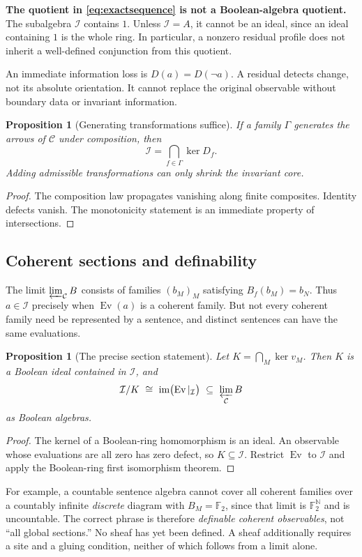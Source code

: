 \documentclass[11pt,letterpaper]{article}
\newtheorem{proposition}[theorem]{Proposition}
\theoremstyle{definition}
\newcommand{\F}{\mathbb F_2}
\newcommand{\im}{\operatorname{im}}
\newcommand{\Ev}{\operatorname{Ev}}
\newcommand{\Inv}{\mathcal I}
\begin{document}
\textbf{The quotient in \eqref{eq:exactsequence} is not a Boolean-algebra quotient.} The subalgebra $\Inv$ contains $1$. Unless $\Inv=A$, it cannot be an ideal, since an ideal containing $1$ is the whole ring. In particular, a nonzero residual profile does not inherit a well-defined conjunction from this quotient.

An immediate information loss is $D(a)=D(\neg a)$. A residual detects change, not its absolute orientation. It cannot replace the original observable without boundary data or invariant information.

\begin{proposition}[Generating transformations suffice]\label{prop:generators}
If a family $\Gamma$ generates the arrows of $\mathcal C$ under composition, then
\[
\Inv=\bigcap_{f\in\Gamma}\ker D_f.
\]
Adding admissible transformations can only shrink the invariant core.
\end{proposition}
\begin{proof}
The composition law propagates vanishing along finite composites. Identity defects vanish. The monotonicity statement is an immediate property of intersections.
\end{proof}

\subsection{Coherent sections and definability}
The limit $\varprojlim_{\mathcal C}B$ consists of families $(b_M)_M$ satisfying $B_f(b_M)=b_N$. Thus $a\in\Inv$ precisely when $\Ev(a)$ is a coherent family. But not every coherent family need be represented by a sentence, and distinct sentences can have the same evaluations.

\begin{proposition}[The precise section statement]\label{prop:sections}
Let $K=\bigcap_M\ker v_M$. Then $K$ is a Boolean ideal contained in $\Inv$, and
\[
\Inv/K\ \cong\ \im\bigl(\Ev|_{\Inv}\bigr)
\ \subseteq\ \varprojlim_{\mathcal C}B
\]
as Boolean algebras.
\end{proposition}
\begin{proof}
The kernel of a Boolean-ring homomorphism is an ideal. An observable whose evaluations are all zero has zero defect, so $K\subseteq\Inv$. Restrict $\Ev$ to $\Inv$ and apply the Boolean-ring first isomorphism theorem.
\end{proof}

For example, a countable sentence algebra cannot cover all coherent families over a countably infinite \emph{discrete} diagram with $B_M=\F$, since that limit is $\F^{\mathbb N}$ and is uncountable. The correct phrase is therefore \emph{definable coherent observables}, not ``all global sections.'' No sheaf has yet been defined. A sheaf additionally requires a site and a gluing condition, neither of which follows from a limit alone.
\end{document}
